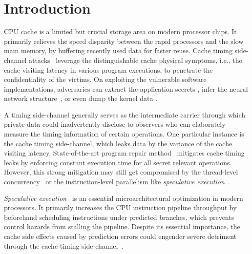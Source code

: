 \documentclass[sigconf]{acmart}
\begin{document}
\renewcommand{\shortauthors}{S. Guo et al.}


\section{Introduction}
\label{sec:intro}


CPU cache is a limited but crucial storage area on modern processor chips. 
It primarily relieves the speed disparity between the rapid processors and 
the slow main memory, by buffering recently used data for faster reuse. Cache 
timing side-channel attacks~\cite{Kocher96,DhemKLMQW98} leverage the 
distinguishable cache physical symptoms, i.e., the cache visiting latency 
in various program executions, to penetrate the confidentiality of the victims. 
On exploiting the vulnerable software implementations, adversaries can extract 
the application secrets
\cite{OsvikST06,TromerOS10,GullaschBK11,CGM16}, infer the neural network 
structure~\cite{YanFT18,HuLDLXJDLSX18,HongDKLRKDD18,DudduSRB18}, or even dump 
the kernel data
\cite{HundWH13,LippSGPHFHMKGYH18,KocherGGHHLMPSY19,WeisseVMGKPSSWY18}.


A timing side-channel generally serves as the intermediate carrier through
which private data could inadvertently disclose to observers who can elaborately 
measure the timing information of certain operations. One particular instance 
is the cache timing side-channel, which leaks data by the variance of the 
cache visiting latency. State-of-the-art program repair method~\cite{WuGSW18} 
mitigates cache timing leaks by enforcing constant execution time for all 
secret relevant operations. However, this strong mitigation may still get 
compromised by the thread-level concurrency~\cite{GuoWW18} or the 
instruction-level parallelism like \textit{speculative execution}~\cite{kimuraKT1996}.


\textit{Speculative execution}~\cite{kimuraKT1996} is an essential microarchitectural
optimization in modern processors. It primarily increases the CPU instruction pipeline 
throughput by beforehand scheduling instructions under predicted branches, which prevents 
control hazards from stalling the pipeline. Despite its essential importance, the cache 
side effects caused by prediction errors could engender severe detriment through the cache 
timing side-channel~\cite{KocherGGHHLMPSY19,BulckMWGKPSWYS18,WeisseVMGKPSSWY18,IslamMBKGES19}. 
\end{document}
